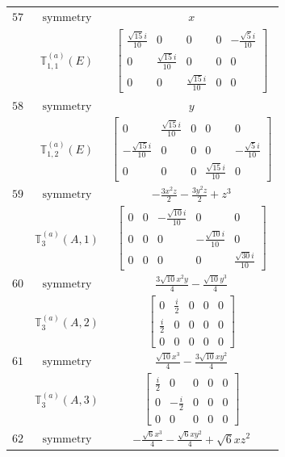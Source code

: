 \documentclass[fleqn,8pt,landscape]{jsarticle}
\begin{document}
\begin{longtable}{ccc}
$ 57 $ & $ \text{symmetry} $ & $ x $ \\
$  $ & $ \mathbb{T}_{1,1}^{(a)}(E) $ & $ \begin{bmatrix} \frac{\sqrt{15} i}{10} & 0 & 0 & 0 & - \frac{\sqrt{5} i}{10} \\ 0 & \frac{\sqrt{15} i}{10} & 0 & 0 & 0 \\ 0 & 0 & \frac{\sqrt{15} i}{10} & 0 & 0 \end{bmatrix} $ \\ \hline
$ 58 $ & $ \text{symmetry} $ & $ y $ \\
$  $ & $ \mathbb{T}_{1,2}^{(a)}(E) $ & $ \begin{bmatrix} 0 & \frac{\sqrt{15} i}{10} & 0 & 0 & 0 \\ - \frac{\sqrt{15} i}{10} & 0 & 0 & 0 & - \frac{\sqrt{5} i}{10} \\ 0 & 0 & 0 & \frac{\sqrt{15} i}{10} & 0 \end{bmatrix} $ \\ \hline
$ 59 $ & $ \text{symmetry} $ & $ - \frac{3 x^{2} z}{2} - \frac{3 y^{2} z}{2} + z^{3} $ \\
$  $ & $ \mathbb{T}_{3}^{(a)}(A,1) $ & $ \begin{bmatrix} 0 & 0 & - \frac{\sqrt{10} i}{10} & 0 & 0 \\ 0 & 0 & 0 & - \frac{\sqrt{10} i}{10} & 0 \\ 0 & 0 & 0 & 0 & \frac{\sqrt{30} i}{10} \end{bmatrix} $ \\ \hline
$ 60 $ & $ \text{symmetry} $ & $ \frac{3 \sqrt{10} x^{2} y}{4} - \frac{\sqrt{10} y^{3}}{4} $ \\
$  $ & $ \mathbb{T}_{3}^{(a)}(A,2) $ & $ \begin{bmatrix} 0 & \frac{i}{2} & 0 & 0 & 0 \\ \frac{i}{2} & 0 & 0 & 0 & 0 \\ 0 & 0 & 0 & 0 & 0 \end{bmatrix} $ \\ \hline
$ 61 $ & $ \text{symmetry} $ & $ \frac{\sqrt{10} x^{3}}{4} - \frac{3 \sqrt{10} x y^{2}}{4} $ \\
$  $ & $ \mathbb{T}_{3}^{(a)}(A,3) $ & $ \begin{bmatrix} \frac{i}{2} & 0 & 0 & 0 & 0 \\ 0 & - \frac{i}{2} & 0 & 0 & 0 \\ 0 & 0 & 0 & 0 & 0 \end{bmatrix} $ \\ \hline
$ 62 $ & $ \text{symmetry} $ & $ - \frac{\sqrt{6} x^{3}}{4} - \frac{\sqrt{6} x y^{2}}{4} + \sqrt{6} x z^{2} $ \\

\end{longtable}
\end{document}
